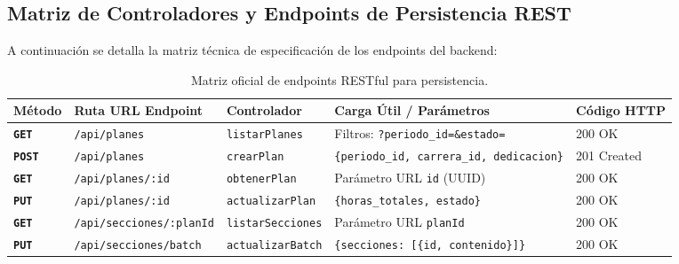 \documentclass[12pt,a4paper]{article}
\begin{document}
\subsection{Matriz de Controladores y Endpoints de Persistencia REST}
A continuación se detalla la matriz técnica de especificación de los endpoints del backend:
\begin{table}[H]
\centering
\small
\renewcommand{\arraystretch}{1.2}
\begin{tabularx}{\textwidth}{|>{\hsize=0.45\hsize\centering\arraybackslash\bfseries\footnotesize}X|>{\hsize=1.30\hsize\raggedright\arraybackslash\footnotesize}X|>{\hsize=1.10\hsize\raggedright\arraybackslash\footnotesize}X|>{\hsize=1.45\hsize\raggedright\arraybackslash\footnotesize}X|>{\hsize=0.70\hsize\centering\arraybackslash\footnotesize}X|}
\hline
\rowcolor{tableheader}
\textbf{Método} & \textbf{Ruta URL Endpoint} & \textbf{Controlador} & \textbf{Carga Útil / Parámetros} & \textbf{Código HTTP} \\
\hline
\texttt{GET} & \texttt{/\allowbreak  api/\allowbreak  planes} & \texttt{listarPlanes} & Filtros: \texttt{?periodo\_\allowbreak  id=\&estado=} & 200 OK \\
\hline
\texttt{POST} & \texttt{/\allowbreak  api/\allowbreak  planes} & \texttt{crearPlan} & \texttt{\{periodo\_\allowbreak  id, carrera\_\allowbreak  id, dedicacion\}} & 201 Created \\
\hline
\texttt{GET} & \texttt{/\allowbreak  api/\allowbreak  planes/\allowbreak  :id} & \texttt{obtenerPlan} & Parámetro URL \texttt{id} (UUID) & 200 OK \\
\hline
\texttt{PUT} & \texttt{/\allowbreak  api/\allowbreak  planes/\allowbreak  :id} & \texttt{actualizarPlan} & \texttt{\{horas\_\allowbreak  totales, estado\}} & 200 OK \\
\hline
\texttt{GET} & \texttt{/\allowbreak  api/\allowbreak  secciones/\allowbreak   :planId} & \texttt{listarSecciones} & Parámetro URL \texttt{planId} & 200 OK \\
\hline
\texttt{PUT} & \texttt{/\allowbreak  api/\allowbreak  secciones/\allowbreak   batch} & \texttt{actualizarBatch} & \texttt{\{secciones: [\{id, contenido\}]\}} & 200 OK \\
\hline
\end{tabularx}
\caption{Matriz oficial de endpoints RESTful para persistencia.}
\label{tab:endpoints_matrix}
\end{table}
\end{document}
